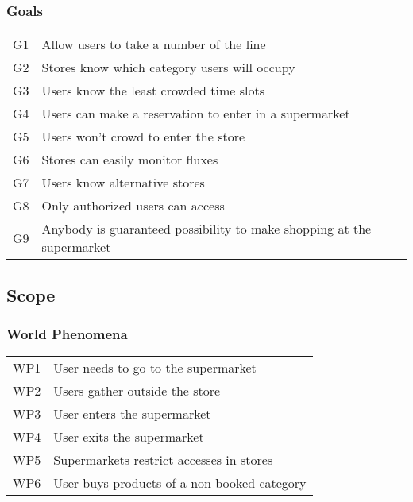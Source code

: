 \subsubsection{Goals}

\begin{tabular}{l|l}
	G1 & Allow users to take a number of the line\\
	G2 & Stores know which category users will occupy\\
	G3 & Users know the least crowded time slots\\
	G4 & Users can make a reservation to enter in a supermarket\\
	G5 & Users won't crowd to enter the store\\
	G6 & Stores can easily monitor fluxes\\
	G7 & Users know alternative stores\\
	G8 & Only authorized users can access\\
	G9 & Anybody is guaranteed possibility to make shopping at the supermarket\\
\end{tabular}


\subsection{Scope}


\subsubsection{World Phenomena}

\begin{tabular}{l|l}
	WP1 & User needs to go to the supermarket\\
	WP2 & Users gather outside the store\\
	WP3 & User enters the supermarket\\
	WP4 & User exits the supermarket\\
	WP5 & Supermarkets restrict accesses in stores\\ %
	WP6 & User buys products of a non booked category\\
\end{tabular}

